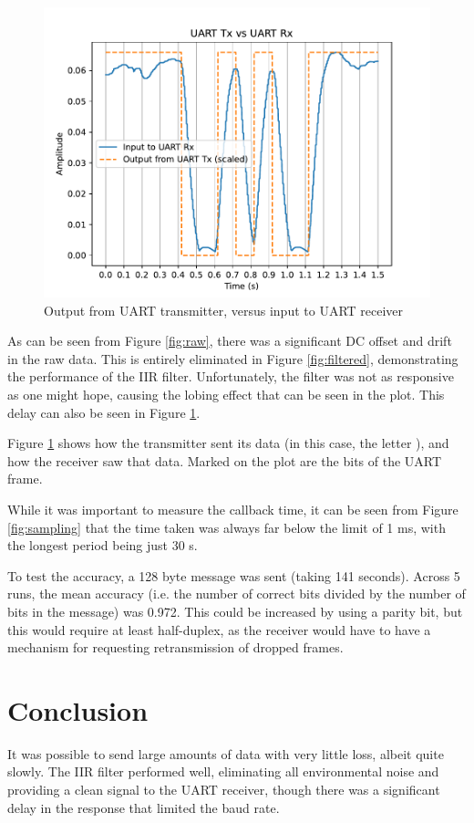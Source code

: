\documentclass{article}
\begin{document}
\begin{multicols}{2}
\begin{figure}[H]
    \includegraphics[width=\linewidth]{figures/uart.pdf}
    \caption{Output from UART transmitter, versus input to UART receiver}
    \label{fig:uart}
\end{figure}

As can be seen from Figure \ref{fig:raw}, there was a significant DC offset and drift in the raw data. This is entirely eliminated in Figure \ref{fig:filtered}, demonstrating the performance of the IIR filter. Unfortunately, the filter was not as responsive as one might hope, causing the lobing effect that can be seen in the plot. This delay can also be seen in Figure \ref{fig:uart}. 

Figure \ref{fig:uart} shows how the transmitter sent its data (in this case, the letter ), and how the receiver saw that data. Marked on the plot are the bits of the UART frame.

While it was important to measure the callback time, it can be seen from Figure \ref{fig:sampling} that the time taken was always far below the limit of 1 ms, with the longest period being just 30 \textmu s.

To test the accuracy, a 128 byte message was sent (taking 141 seconds). Across 5 runs, the mean accuracy (i.e. the number of correct bits divided by the number of bits in the message) was 0.972. This could be increased by using a parity bit, but this would require at least half-duplex, as the receiver would have to have a mechanism for requesting retransmission of dropped frames. 

\section{Conclusion}
It was possible to send large amounts of data with very little loss, albeit quite slowly. The IIR filter performed well, eliminating all environmental noise and providing a clean signal to the UART receiver, though there was a significant delay in the response that limited the baud rate.


\end{multicols}
\end{document}
